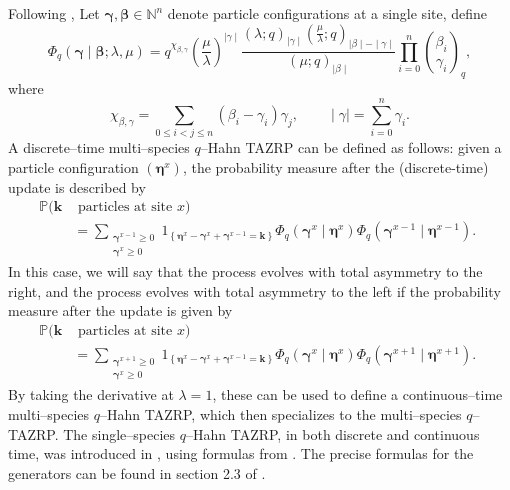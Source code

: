 \documentclass{ximera}
\begin{document}
 Following \cite{KMMO}, Let $\boldsymbol\gamma , \boldsymbol\beta\in \mathbb{N}^n$ denote particle configurations at a single site,  define
$$
\Phi_{q}(\boldsymbol\gamma \mid \boldsymbol\beta ; \lambda, \mu)=q^{\chi_{\beta, \gamma}}\left(\frac{\mu}{\lambda}\right)^{\mid\gamma\mid} \frac{(\lambda ; q)_{\mid\gamma\mid}\left(\frac{\mu}{\lambda} ; q\right)_{\mid\beta\mid-\mid\gamma\mid}}{(\mu ; q)_{\mid\beta\mid}} \prod_{i=0}^{n} \binom{\beta_i}{\gamma_i}_q,
$$
where 
$$
\chi_{\beta, \gamma}=\sum_{0 \leq i<j \leq n}\left(\beta_{i}-\gamma_{i}\right) \gamma_{j},\qquad \mid\gamma\mid=\sum_{i=0}^n \gamma_i.
$$
A discrete--time multi--species $q$--Hahn TAZRP can be defined as follows:
given a particle configuration $\left(\boldsymbol\eta^x\right)$, the probability measure after the (discrete-time) update is described by
\begin{align*}
\mathbb{P}( \boldsymbol{k} & \text { particles at site } x) \\ & =\sum_{\substack{\boldsymbol\gamma^{x-1} \geq 0 \\ \boldsymbol\gamma^x \geq 0}} 1_{\left\{\boldsymbol\eta^x-\boldsymbol\gamma^x+\boldsymbol\gamma^{x-1}=\boldsymbol{k}\right\}} \Phi_q\left(\boldsymbol\gamma^x \mid \boldsymbol\eta^x\right) \Phi_q\left(\boldsymbol\gamma^{x-1} \mid \boldsymbol\eta^{x-1}\right) \text {. }
\end{align*}
 In this case, we will say that the process evolves with total asymmetry to the right, and the process evolves with total asymmetry to the left  if the probability measure after the update is given by
\begin{align*}
\mathbb{P}( \boldsymbol{k} & \text { particles at site } x) \\ & = \sum_{\substack{\boldsymbol\gamma^{x+1} \geq 0 \\ \boldsymbol\gamma^x \geq 0}} 1_{\left\{\boldsymbol\eta^x-\boldsymbol\gamma^x+\boldsymbol\gamma^{x-1}=\boldsymbol{k}\right\}} \Phi_q\left(\boldsymbol\gamma^x \mid \boldsymbol\eta^x\right) \Phi_q\left(\boldsymbol\gamma^{x+1} \mid \boldsymbol\eta^{x+1}\right) \text {. }
\end{align*}
 By taking the derivative at $\lambda=1$, these can  be used to define a continuous--time multi--species $q$--Hahn TAZRP, which then specializes to the multi--species $q$--TAZRP. The single--species $q$--Hahn TAZRP, in both discrete and continuous time, was introduced in \cite{Corwin2015TheQB}, using formulas from \cite{Po}. The precise formulas for the generators can be found in section 2.3 of \cite{KuanCMP}.
\end{document}
